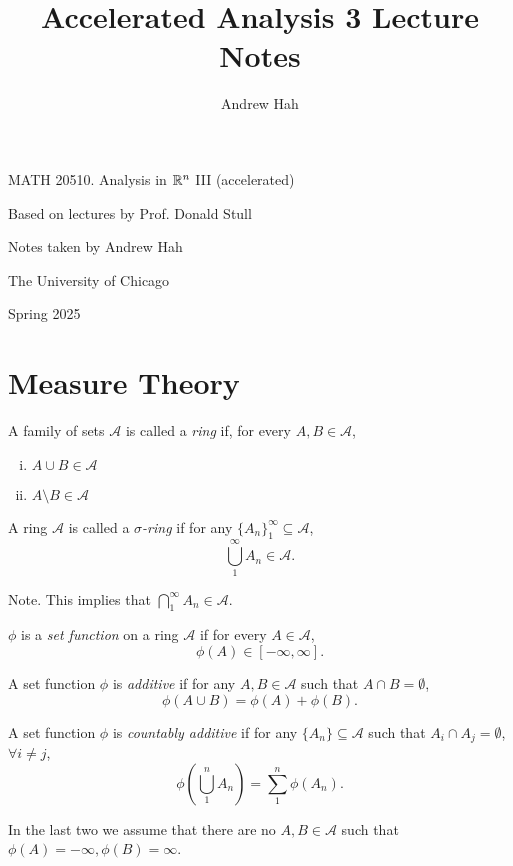 \documentclass[11pt]{article}
\title{Accelerated Analysis 3 Lecture Notes}
\author{Andrew Hah}
\begin{document}
\thispagestyle{empty}  %

\begin{center}
  {\Large MATH 20510. Analysis in $\mathbb{R}^{n}$ III (accelerated)}\par
  \vspace{3ex}
  {\large Based on lectures by Prof. Donald Stull}\par
  {\normalsize Notes taken by Andrew Hah}\par
  \vspace{2ex}
  {\small The University of Chicago}\par
  {\small Spring 2025}
\end{center}

\section{Measure Theory}

\begin{definition}
    A family of sets $\mathscr{A}$ is called a \emph{ring} if, for every $A, B \in \mathscr{A}$, \begin{enumerate} [(i), nosep, left=0pt]
        \item $A \cup B \in \mathscr{A}$
        \item $A \setminus B \in \mathscr{A}$
    \end{enumerate}
\end{definition}

\begin{definition}
    A ring $\mathscr{A}$ is called a \emph{$\sigma$-ring} if for any $\{ A_n \}_1^\infty \subseteq \mathscr{A}$, $$\bigcup_1^\infty A_n \in \mathscr{A}.$$
\end{definition}

Note. This implies that $\bigcap_1^\infty A_n \in \mathscr{A}$. 

\begin{definition}
    $\phi$ is a \emph{set function} on a ring $\mathscr{A}$ if for every $A \in \mathscr{A}$, $$\phi(A) \in [-\infty, \infty].$$
\end{definition}

\begin{definition}
    A set function $\phi$ is \emph{additive} if for any $A, B \in \mathscr{A}$ such that $A \cap B = \emptyset$, $$\phi(A \cup B) = \phi(A) + \phi(B).$$
\end{definition}

\begin{definition}
    A set function $\phi$ is \emph{countably additive} if for any $\{ A_n \} \subseteq \mathscr{A}$ such that $A_i \cap A_j = \emptyset$, $\forall i \neq j$, $$\phi \left( \bigcup_1^n A_n \right) = \sum_1^n \phi(A_n).$$
\end{definition}
In the last two we assume that there are no $A, B \in \mathscr{A}$ such that $\phi(A) = -\infty, \phi(B) = \infty$. 
\end{document}
